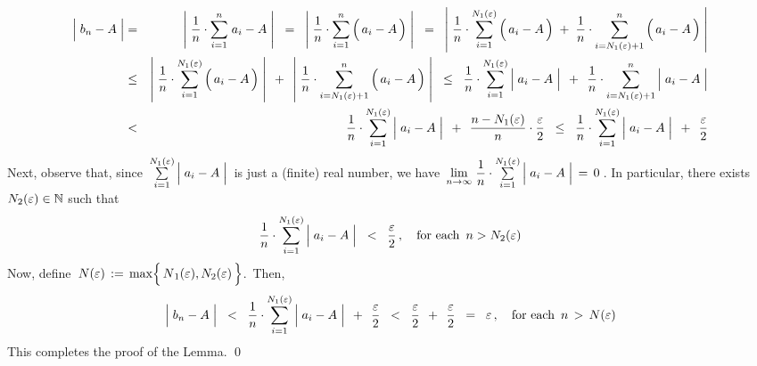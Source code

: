 \begin{eqnarray*}
\left\vert\;b_{n} - \overset{{\color{white}.}}{A}\;\right\vert
&=&
	\left\vert\;\dfrac{1}{n}\cdot\overset{n}{\underset{i=1}{\sum}}\;a_{i} - \overset{{\color{white}.}}{A}\;\right\vert
	\;\; = \;\;
	\left\vert\;\dfrac{1}{n}\cdot\overset{n}{\underset{i=1}{\sum}}\left(\,a_{i} - \overset{{\color{white}.}}{A}\,\right)\;\right\vert
	\;\; = \;\;
	\left\vert\;
		\dfrac{1}{n}\cdot\overset{N_{1}(\varepsilon)}{\underset{i=1}{\sum}}\left(\,a_{i} - \overset{{\color{white}.}}{A}\,\right)
		\;+\;
		\dfrac{1}{n}\cdot\overset{n}{\underset{i=N_{1}(\varepsilon)+1}{\sum}}\left(\,a_{i} - \overset{{\color{white}.}}{A}\,\right)
		\;\right\vert
\\
&\leq&
	\left\vert\;
		\dfrac{1}{n}\cdot\overset{N_{1}(\varepsilon)}{\underset{i=1}{\sum}}\left(\,a_{i} - \overset{{\color{white}.}}{A}\,\right)
		\;\right\vert
	\;\,+\;\,
	\left\vert\;
		\dfrac{1}{n}\cdot\overset{n}{\underset{i=N_{1}(\varepsilon)+1}{\sum}}\left(\,a_{i} - \overset{{\color{white}.}}{A}\,\right)
		\;\right\vert
	\;\; \leq \;\;
	\dfrac{1}{n} \cdot \overset{N_{1}(\varepsilon)}{\underset{i=1}{\sum}}
		\left\vert\; a_{i} - \overset{{\color{white}.}}{A} \;\right\vert
	\;\,+\;\,
	\dfrac{1}{n} \cdot \overset{n}{\underset{i=N_{1}(\varepsilon)+1}{\sum}}
		\left\vert\; a_{i} - \overset{{\color{white}.}}{A} \;\right\vert
\\
&<&
	\dfrac{1}{n} \cdot \overset{N_{1}(\varepsilon)}{\underset{i=1}{\sum}}
		\left\vert\; a_{i} - \overset{{\color{white}.}}{A} \;\right\vert
	\;\,+\;\,
	\dfrac{n - N_{1}(\varepsilon)}{n} \cdot \dfrac{\varepsilon}{2}
	\;\; \leq \;\;
	\dfrac{1}{n} \cdot \overset{N_{1}(\varepsilon)}{\underset{i=1}{\sum}}
		\left\vert\; a_{i} - \overset{{\color{white}.}}{A} \;\right\vert
	\;\,+\;\,
	\dfrac{\varepsilon}{2}
\end{eqnarray*}
Next, observe that, since
\,$\overset{N_{1}(\varepsilon)}{\underset{i=1}{\sum}}\left\vert\; a_{i} - \overset{{\color{white}.}}{A} \;\right\vert$\,
is just a (finite) real number, we have
\,$\underset{n\rightarrow\infty}{\lim}\;\dfrac{1}{n} \cdot \overset{N_{1}(\varepsilon)}{\underset{i=1}{\sum}}\left\vert\; a_{i} - \overset{{\color{white}.}}{A} \;\right\vert \,=\, 0$\,.
In particular, there exists \,$N_{2}(\varepsilon) \in \mathbb{N}$ such that
\begin{equation*}
\dfrac{1}{n} \cdot \overset{N_{1}(\varepsilon)}{\underset{i=1}{\sum}}\left\vert\; a_{i} - \overset{{\color{white}.}}{A} \;\right\vert
\;\; < \;\; \dfrac{\varepsilon}{2}\,,
\quad
\textnormal{for each \,$n > N_{2}(\varepsilon)$}
\end{equation*}
Now, define \,$N(\varepsilon) \,:=\, \max\!\left\{\,\overset{{\color{white}.}}{N}_{1}(\varepsilon),N_{2}(\varepsilon)\,\right\}$.\,
Then,
\begin{eqnarray*}
\left\vert\;b_{n} - \overset{{\color{white}.}}{A}\;\right\vert
\;\; < \;\;
	\dfrac{1}{n} \cdot \overset{N_{1}(\varepsilon)}{\underset{i=1}{\sum}}
		\left\vert\; a_{i} - \overset{{\color{white}.}}{A} \;\right\vert
		\;\,+\;\,
		\dfrac{\varepsilon}{2}
\;\; < \;\;
	\dfrac{\varepsilon}{2} \;\,+\;\, \dfrac{\varepsilon}{2}
\;\; = \;\;
	\varepsilon\,,
\quad
\textnormal{for each \,$n \,>\, N(\varepsilon)$}
\end{eqnarray*}
This completes the proof of the Lemma.
\qed


